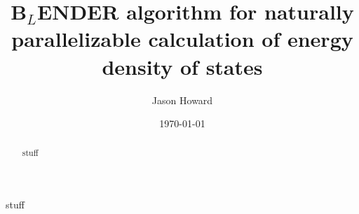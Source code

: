 \documentclass[aps,prl,reprint,superscriptaddress,showkeys]{revtex4-1}
\begin{document}
\title{B$_L$ENDER algorithm for naturally parallelizable calculation of energy density of states}

\author{Jason Howard}

\date{\today}

%


\begin{acknowledgments}
stuff
\end{acknowledgments}
\begin{abstract}
stuff
\end{abstract}
\maketitle
\end{document}
